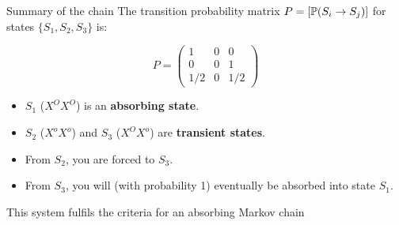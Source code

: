 \documentclass[aspectratio=169]{beamer}\usepackage[]{graphicx}\usepackage[]{xcolor}
\begin{document}
\begin{frame}{Summary of the chain}
    The transition probability matrix $P = [ \mathbb{P}(S_i \to S_j) ]$ for states $\{S_1, S_2, S_3\}$ is:
    
    $$
    P = \begin{pmatrix}
    1 & 0 & 0 \\
    0 & 0 & 1 \\
    1/2 & 0 & 1/2
    \end{pmatrix}
    $$
    
    \vfill
    
    \begin{itemize}
        \item $S_1$ ($X^O X^O$) is an \textbf{absorbing state}.
        \item $S_2$ ($X^o X^o$) and $S_3$ ($X^O X^o$) are \textbf{transient states}.
        \item From $S_2$, you are forced to $S_3$.
        \item From $S_3$, you will (with probability 1) eventually be absorbed into state $S_1$.
    \end{itemize}
    
    This system fulfils the criteria for an absorbing Markov chain
\end{frame}
\end{document}
